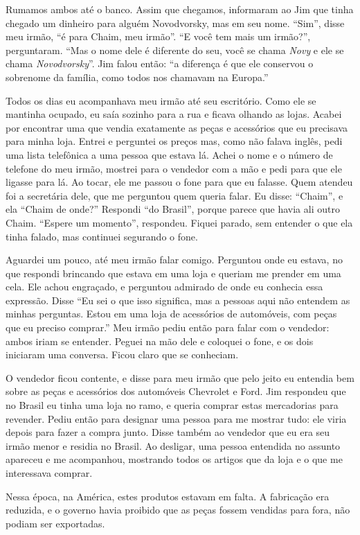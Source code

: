 Rumamos ambos até o banco. Assim que chegamos, informaram ao Jim que tinha
chegado um dinheiro para alguém Novodvorsky, mas em seu nome. ``Sim'',
disse meu irmão, ``é para Chaim, meu irmão''. ``E você tem mais um
irmão?'', perguntaram. ``Mas o nome dele é diferente do seu, você se
chama \textit{Novy} e ele se chama \textit{Novodvorsky}''. Jim falou então: ``a diferença é
que ele conservou o sobrenome da família, como todos nos chamavam na
Europa.''

Todos os dias eu acompanhava meu irmão até seu escritório. Como ele
se mantinha ocupado, eu saía sozinho para a rua e ficava
olhando as lojas. Acabei por encontrar uma que vendia exatamente as peças e
acessórios que eu precisava para minha loja. Entrei e perguntei
os preços mas, como não falava inglês, pedi uma lista telefônica a uma
pessoa que estava lá. Achei o nome e o número de telefone do meu irmão,
mostrei para o vendedor com a mão e pedi para que ele ligasse para lá.
Ao tocar, ele me passou o fone para que eu falasse. Quem
atendeu foi a secretária dele, que me perguntou quem queria
falar. Eu disse: ``Chaim'', e ela ``Chaim de onde?'' Respondi ``do Brasil'', porque
parece que havia ali outro Chaim. ``Espere um momento'', respondeu. Fiquei
parado, sem entender o que ela tinha falado, mas
continuei segurando o fone.

Aguardei um pouco, até meu irmão falar comigo. Perguntou
onde eu estava, no que respondi brincando que estava em uma loja e queriam me
prender em uma cela. Ele achou engraçado, e perguntou admirado de onde eu
conhecia essa expressão. Disse ``Eu sei o que isso significa, mas a
pessoas aqui não entendem as minhas perguntas. Estou em uma loja de
acessórios de automóveis, com peças que eu preciso comprar.'' 
Meu irmão pediu então para falar com o vendedor: ambos iriam se entender. 
Peguei na mão dele e coloquei o fone, e os
dois iniciaram uma conversa. Ficou claro que se conheciam.

O vendedor ficou contente, e disse para meu irmão que pelo jeito
eu entendia bem sobre as peças e acessórios dos automóveis Chevrolet e
Ford. Jim respondeu que no Brasil eu tinha uma loja no ramo, e queria
comprar estas mercadorias para revender. Pediu então para designar uma pessoa
para me mostrar tudo: ele viria depois para fazer a compra junto.
Disse também ao vendedor que eu era seu irmão menor e residia no Brasil.
Ao desligar, uma pessoa entendida no assunto apareceu e me acompanhou, mostrando todos os
artigos que da loja e o que me interessava comprar.

Nessa época, na América, estes produtos estavam em falta. A fabricação era
reduzida, e o governo havia proibido que as peças fossem vendidas para
fora, não podiam ser exportadas.

